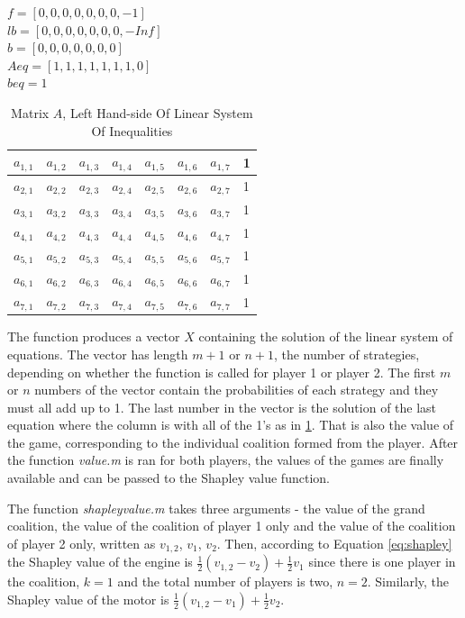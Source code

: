 $f = [0, 0, 0, 0, 0, 0, 0, -1]$ \\
$lb = [0, 0, 0, 0, 0, 0, 0, -Inf]$ \\
$b = [0, 0, 0, 0, 0, 0, 0]$ \\
$Aeq = [ 1, 1, 1, 1, 1, 1, 1, 0 ]$ \\
$beq = 1$

\begin{table}[h]
\centering 
\begin{tabular}{ |m{0.5cm}|m{0.5cm}|m{0.5cm}|m{0.5cm}|m{0.5cm}|m{0.5cm}|m{0.5cm}|m{0.5cm}| } 
\hline
 $a_{1,1}$ & $a_{1,2}$ & $a_{1,3}$ & $a_{1,4}$ & $a_{1,5}$ & $a_{1,6}$ & $a_{1,7}$ & 1 \\ \hline
 $a_{2,1}$ & $a_{2,2}$ & $a_{2,3}$ & $a_{2,4}$ & $a_{2,5}$ & $a_{2,6}$ & $a_{2,7}$ & 1 \\ \hline
 $a_{3,1}$ & $a_{3,2}$ & $a_{3,3}$ & $a_{3,4}$ & $a_{3,5}$ & $a_{3,6}$ & $a_{3,7}$ & 1 \\ \hline
 $a_{4,1}$ & $a_{4,2}$ & $a_{4,3}$ & $a_{4,4}$ & $a_{4,5}$ & $a_{4,6}$ & $a_{4,7}$ & 1 \\ \hline
 $a_{5,1}$ & $a_{5,2}$ & $a_{5,3}$ & $a_{5,4}$ & $a_{5,5}$ & $a_{5,6}$ & $a_{5,7}$ & 1 \\ \hline
 $a_{6,1}$ & $a_{6,2}$ & $a_{6,3}$ & $a_{6,4}$ & $a_{6,5}$ & $a_{6,6}$ & $a_{6,7}$ & 1 \\ \hline
 $a_{7,1}$ & $a_{7,2}$ & $a_{7,3}$ & $a_{7,4}$ & $a_{7,5}$ & $a_{7,6}$ & $a_{7,7}$ & 1 \\ \hline
\end{tabular}
\caption{ Matrix $A$, Left Hand-side Of Linear System Of Inequalities}
\label{tab:A}
\end{table}

The function produces a vector $X$ containing the solution of the linear system of equations. The vector has length $m+1$ or $n+1$, the number of strategies, depending on whether the function is called for player 1 or player 2. The first $m$ or $n$ numbers of the vector contain the probabilities of each strategy and they must all add up to 1. The last number in the vector is the solution of the last equation where the column is with all of the 1's as in \ref{tab:A}. That is also the value of the game, corresponding to the individual coalition formed from the player. After the function \textit{value.m} is ran for both players, the values of the games are finally available and can be passed to the Shapley value function.

The function \textit{shapleyvalue.m} takes three arguments - the value of the grand coalition, the value of the coalition of player 1 only and the value of the coalition of player 2 only, written as $v_{1,2}$, $v_1$, $v_2$. Then, according to Equation \ref{eq:shapley} the Shapley value of the engine is $\frac{1}{2} (v_{1,2} - v_2) + \frac{1}{2} v_1$ since there is one player in the coalition, $k = 1$ and the total number of players is two, $n = 2$. Similarly, the Shapley value of the motor is $\frac{1}{2} (v_{1,2} - v_1) + \frac{1}{2} v_2$.

